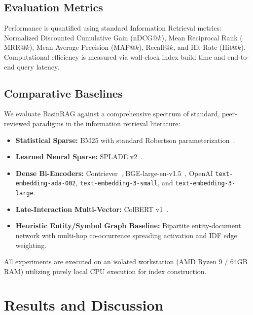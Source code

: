 \documentclass[10pt,twocolumn]{article}
\theoremstyle{definition}
\begin{document}
\subsection{Evaluation Metrics}

Performance is quantified using standard Information Retrieval metrics: Normalized Discounted Cumulative Gain ($\text{nDCG}@k$), Mean Reciprocal Rank ($\text{MRR}@k$), Mean Average Precision ($\text{MAP}@k$), Recall@$k$, and Hit Rate ($\text{Hit}@k$). Computational efficiency is measured via wall-clock index build time and end-to-end query latency.

\subsection{Comparative Baselines}

We evaluate BasinRAG against a comprehensive spectrum of standard, peer-reviewed paradigms in the information retrieval literature:
\begin{itemize}
    \item \textbf{Statistical Sparse:} BM25 with standard Robertson parameterization~\cite{robertson2009probabilistic}.
    \item \textbf{Learned Neural Sparse:} SPLADE v2~\cite{formal2021splade}.
    \item \textbf{Dense Bi-Encoders:} Contriever~\cite{izacard2021unsupervised}, BGE-large-en-v1.5~\cite{xiao2023c}, OpenAI \texttt{text-embedding-ada-002}, \texttt{text-embedding-3-small}, and \texttt{text-embedding-3-large}.
    \item \textbf{Late-Interaction Multi-Vector:} ColBERT v1~\cite{khattab2020colbert}.
    \item \textbf{Heuristic Entity/Symbol Graph Baseline:} Bipartite entity-document network with multi-hop co-occurrence spreading activation and IDF edge weighting.
\end{itemize}

All experiments are executed on an isolated workstation (AMD Ryzen 9 / 64GB RAM) utilizing purely local CPU execution for index construction.

\section{Results and Discussion}
\end{document}
